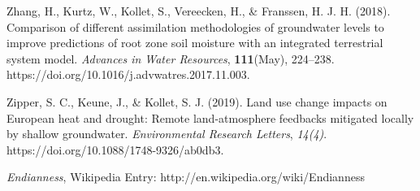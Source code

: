 \begin{thebibliography}{999}
Zhang, H., Kurtz, W., Kollet, S., Vereecken, H., & Franssen, H. J. H. (2018). Comparison of different assimilation methodologies of groundwater levels to improve predictions of root zone soil moisture with an integrated terrestrial system model. {\em Advances in Water Resources}, {\bf 111}(May), 224–238. https://doi.org/10.1016/j.advwatres.2017.11.003.


Zipper, S. C., Keune, J., & Kollet, S. J. (2019). Land use change impacts on European heat and drought: Remote land-atmosphere feedbacks mitigated locally by shallow groundwater. {\em Environmental Research Letters}, {\em 14(4)}. https://doi.org/10.1088/1748-9326/ab0db3.

{\em Endianness}, Wikipedia Entry: http://en.wikipedia.org/wiki/Endianness



\end{thebibliography}
